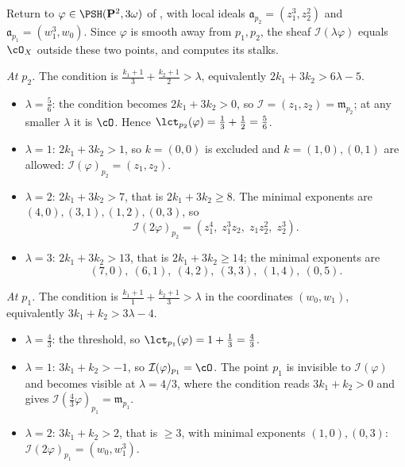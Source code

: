 \begin{example}
\label{ex:ch51-p2-ideals}
Return to $\varphi\in\PSH(\mathbf P^2,3\omega)$ of
, with local ideals
$\mathfrak a_{p_2}=(z_1^3,z_2^2)$ and
$\mathfrak a_{p_1}=(w_1^3,w_0)$.  Since $\varphi$ is smooth away from
$p_1,p_2$, the sheaf $\mathcal I(\lambda\varphi)$ equals $\cO_X$
outside these two points, and  computes its stalks.

\emph{At $p_2$.}  The condition is
$\frac{k_1+1}{3}+\frac{k_2+1}{2}>\lambda$, equivalently
$2k_1+3k_2>6\lambda-5$.
\begin{itemize}
\item $\lambda=\tfrac56$: the condition becomes $2k_1+3k_2>0$, so
      $\mathcal I=(z_1,z_2)=\mathfrak m_{p_2}$; at any smaller
      $\lambda$ it is $\cO$.  Hence
      $\lct_{p_2}(\varphi)=\tfrac13+\tfrac12=\tfrac56$.
\item $\lambda=1$: $2k_1+3k_2>1$, so $k=(0,0)$ is excluded and
      $k=(1,0),(0,1)$ are allowed:
      $\mathcal I(\varphi)_{p_2}=(z_1,z_2)$.
\item $\lambda=2$: $2k_1+3k_2>7$, that is $2k_1+3k_2\geq8$.  The
      minimal exponents are $(4,0),(3,1),(1,2),(0,3)$, so
      \[
       \mathcal I(2\varphi)_{p_2}
       =(z_1^4,\;z_1^3z_2,\;z_1z_2^2,\;z_2^3).
      \]
\item $\lambda=3$: $2k_1+3k_2>13$, that is $2k_1+3k_2\geq14$; the
      minimal exponents are
      \[
       (7,0),\ (6,1),\ (4,2),\ (3,3),\ (1,4),\ (0,5).
      \]
\end{itemize}

\emph{At $p_1$.}  The condition is
$\frac{k_1+1}{1}+\frac{k_2+1}{3}>\lambda$ in the coordinates
$(w_0,w_1)$, equivalently $3k_1+k_2>3\lambda-4$.
\begin{itemize}
\item $\lambda=\tfrac43$: the threshold, so
      $\lct_{p_1}(\varphi)=1+\tfrac13=\tfrac43$.
\item $\lambda=1$: $3k_1+k_2>-1$, so
      $\mathcal I(\varphi)_{p_1}=\cO$.  The point $p_1$ is invisible to $\mathcal I(\varphi)$ and becomes
visible at $\lambda=4/3$, where the condition reads $3k_1+k_2>0$ and
gives $\mathcal I(\tfrac43\varphi)_{p_1}=\mathfrak m_{p_1}$.
\item $\lambda=2$: $3k_1+k_2>2$, that is $\geq3$, with minimal
      exponents $(1,0),(0,3)$:
      $\mathcal I(2\varphi)_{p_1}=(w_0,w_1^3)$.
\end{itemize}


\end{example}
